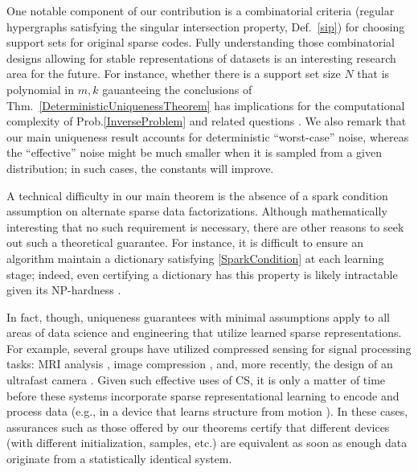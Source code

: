 \documentclass[9pt,twocolumn]{pnas-new}
\begin{document}
One notable component of our contribution is a combinatorial criteria (regular hypergraphs satisfying the singular intersection property, Def.~\ref{sip}) for choosing support sets for original sparse codes. Fully understanding those combinatorial designs allowing for stable representations of datasets is an interesting research area for the future.  For instance, whether there is a support set size $N$ that is polynomial in $m,k$ gauanteeing the conclusions of Thm.~\ref{DeterministicUniquenessTheorem} has implications for the computational complexity of Prob.\ref{InverseProblem} and related questions \cite{Tillmann15}.  We also remark that our main uniqueness result accounts for deterministic ``worst-case'' noise, whereas the ``effective'' noise might be much smaller when it is sampled from a given distribution; in such cases, the constants  %
will improve. %

A technical difficulty in our main theorem is the absence of a spark condition assumption on alternate sparse data factorizations.
Although mathematically interesting that no such requirement is necessary, there are other reasons to seek out such a theoretical guarantee. For instance, it is difficult to ensure an algorithm maintain a dictionary satisfying \eqref{SparkCondition} at each learning stage; indeed, even certifying  a dictionary has this property is likely intractable given its NP-hardness \cite{tillmann2014computational}.

In fact, though, uniqueness guarantees with minimal assumptions apply to all areas of data science and engineering that utilize learned sparse representations.  For example, several groups have utilized compressed sensing for signal processing tasks: MRI analysis \cite{lustig2008compressed},  image compression \cite{Duarte08}, and, more recently, the design of an ultrafast camera \cite{Gao14}. Given such effective uses of CS, it is only a matter of time before these systems incorporate sparse representational learning to encode and process data (e.g., in a device that learns structure from motion \cite{kong2016prior}).  In these cases, assurances such as those offered by our theorems certify that different devices (with different initialization, samples, etc.) are equivalent as soon as enough data originate from a statistically identical system.
%  
\end{document}
